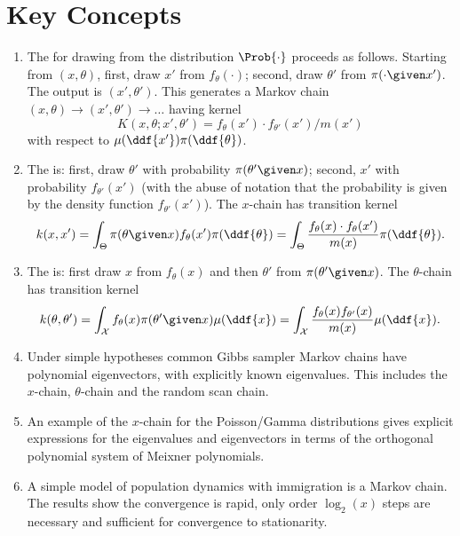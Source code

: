 \documentclass[12pt]{article}
\begin{document}
\section*{Key Concepts}

\begin{enumerate}
    \item
        The %
        for drawing from the distribution \( \Prob{\cdot} \) proceeds as
        follows.  Starting from \( (x, \theta) \), first, draw \( x' \)
        from \( f_{\theta}(\cdot) \); second, draw \( \theta' \) from \(
        \pi(\cdot \given x') \).  The output is \( (x' , \theta') \).
        This generates a Markov chain \( (x, \theta) \to (x', \theta')
        \to \dots \) having kernel
        \[
            K(x, \theta; x', \theta') = f_{\theta}(x') \cdot f_{\theta'}
            (x')/m(x')
        \] with respect to \( \mu(\ddf{x'})\pi(\ddf{\theta}) \).
    \item
        The %
        is:  first, draw \( \theta' \) with probability \( \pi(\theta'
        \given x) \); second, \( x' \) with probability \( f_{\theta'}(x')
        \) (with the abuse of notation that the probability is given by
        the density function \( f_{\theta'}(x') \)).  The \( x \)-chain
        has transition kernel
        \[
            k(x,x') = \int_{\Theta} \pi(\theta \given x) f_{\theta}(x')
            \pi(\ddf{\theta}) = \int_{\Theta} \frac{f_{\theta}(x) \cdot
            f_ {\theta}(x')}{m(x)} \pi(\ddf{\theta}).
        \]
    \item
        The %
        is:  first draw \( x \) from \( f_{\theta} (x) \) and then \(
        \theta' \) from \( \pi(\theta' \given x) \).  The \( \theta \)-chain
        has transition kernel
        \[
            k(\theta,\theta') = \int_{\mathcal{X}} f_{\theta}(x) \pi(\theta'
            \given x) \mu (\ddf{x}) = \int_{\mathcal{X}} \frac{f_{\theta}
            (x) f_{\theta'}(x)}{m(x)} \mu(\ddf{x}).
        \]
    \item
        Under simple hypotheses common Gibbs sampler Markov chains have
        polynomial eigenvectors, with explicitly known eigenvalues. This
        includes the \( x \)-chain, \( \theta \)-chain and the random
        scan chain.
    \item
        An example of the \( x \)-chain for the Poisson/Gamma
        distributions gives explicit expressions for the eigenvalues and
        eigenvectors in terms of the orthogonal polynomial system of
        Meixner polynomials.
    \item
        A simple model of population dynamics with immigration is a
        Markov chain.  The results show the convergence is rapid, only
        order \( \log_2(x) \) steps are necessary and sufficient for
        convergence to stationarity.
\end{enumerate}
\end{document}
